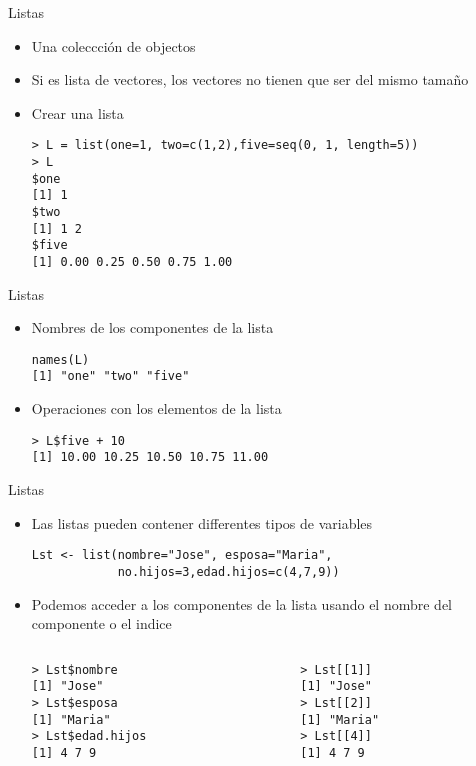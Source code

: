 \documentclass{beamer}
\begin{document}
\begin{frame}[fragile]{Listas}
\begin{itemize}
\item Una coleccción de objectos
\item Si es lista de vectores, los vectores no tienen que ser del mismo tamaño
\item Crear una lista 
\begin{verbatim}
> L = list(one=1, two=c(1,2),five=seq(0, 1, length=5))
> L
$one
[1] 1
$two
[1] 1 2
$five
[1] 0.00 0.25 0.50 0.75 1.00
\end{verbatim}
\end{itemize}
\end{frame}



\begin{frame}[fragile]{Listas}
\begin{itemize}
\item Nombres de los componentes de la lista
\begin{verbatim}
names(L)
[1] "one" "two" "five"
\end{verbatim} 
\item Operaciones con los elementos de la lista
\begin{verbatim}
> L$five + 10
[1] 10.00 10.25 10.50 10.75 11.00
\end{verbatim}
\end{itemize}
\end{frame}

\begin{frame}[fragile]{Listas}
\begin{itemize}
\item Las listas pueden contener differentes tipos de variables
\begin{verbatim}
Lst <- list(nombre="Jose", esposa="Maria",
            no.hijos=3,edad.hijos=c(4,7,9))
\end{verbatim}
\item Podemos acceder a los componentes de la lista usando el nombre del componente o el indice
\begin{columns}
    \begin{column}{0.45\textwidth}
\begin{verbatim}
> Lst$nombre
[1] "Jose"
> Lst$esposa
[1] "Maria"
> Lst$edad.hijos
[1] 4 7 9
\end{verbatim}
    \end{column}
    \begin{column}{0.45\textwidth}
\begin{verbatim}
> Lst[[1]]
[1] "Jose"
> Lst[[2]]
[1] "Maria"
> Lst[[4]]
[1] 4 7 9
\end{verbatim}
    \end{column}
\end{columns}
\end{itemize}
\end{frame}
\end{document}
